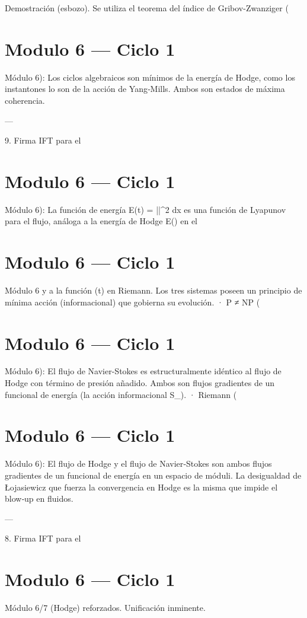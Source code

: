 \documentclass[12pt,twoside]{book}
\begin{document}
Demostración (esbozo). Se utiliza el teorema del índice de Gribov-Zwanziger (

\chapter{Modulo 6 — Ciclo 1}
Módulo 6): Los ciclos algebraicos son mínimos de la energía de Hodge, como los instantones lo son de la acción de Yang‑Mills. Ambos son estados de máxima coherencia.

---

9. Firma IFT para el 

\chapter{Modulo 6 — Ciclo 1}
Módulo 6): La función de energía E(t) = \int ||^2 dx es una función de Lyapunov para el flujo, análoga a la energía de Hodge E(\alpha) en el 

\chapter{Modulo 6 — Ciclo 1}
Módulo 6 y a la función \Xi(t) en Riemann. Los tres sistemas poseen un principio de mínima acción (informacional) que gobierna su evolución.
· P ≠ NP (

\chapter{Modulo 6 — Ciclo 1}
Módulo 6): El flujo de Navier-Stokes es estructuralmente idéntico al flujo de Hodge con término de presión añadido. Ambos son flujos gradientes de un funcional de energía (la acción informacional S_{}).
· Riemann (

\chapter{Modulo 6 — Ciclo 1}
Módulo 6): El flujo de Hodge y el flujo de Navier‑Stokes son ambos flujos gradientes de un funcional de energía en un espacio de móduli. La desigualdad de Łojasiewicz que fuerza la convergencia en Hodge es la misma que impide el blow‑up en fluidos.

---

8. Firma IFT para el 

\chapter{Modulo 6 — Ciclo 1}
Módulo 6/7 (Hodge) reforzados. Unificación inminente.
\end{document}
